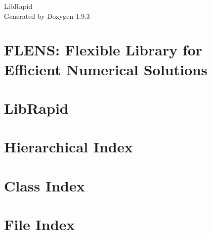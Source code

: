 \documentclass[twoside]{book}
\newcommand{\+}{\discretionary{\mbox{\scriptsize$\hookleftarrow$}}{}{}}
\newcommand{\clearemptydoublepage}{%
    \newpage{\pagestyle{empty}\cleardoublepage}%
  }
\begin{document}
  \raggedbottom
    \hypersetup{pageanchor=false,
                bookmarksnumbered=true,
                pdfencoding=unicode
               }
  \begin{titlepage}
  \vspace*{7cm}
  \begin{center}%
  {\Large Lib\+Rapid}\\
  \vspace*{1cm}
  {\large Generated by Doxygen 1.9.3}\\
  \end{center}
  \end{titlepage}
  \clearemptydoublepage
  \tableofcontents
  \clearemptydoublepage
  \hypersetup{pageanchor=true}
\chapter{FLENS\+: Flexible Library for Efficient Numerical Solutions}
\label{md_librapid_cxxblas__r_e_a_d_m_e}

\chapter{Lib\+Rapid}
\label{md_librapid__r_e_a_d_m_e}

\chapter{Hierarchical Index}

\chapter{Class Index}

\chapter{File Index}

\end{document}
